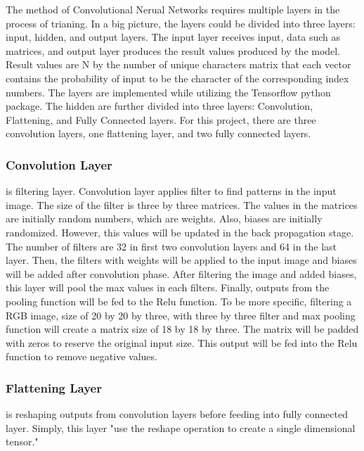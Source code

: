 The method of Convolutional Nerual Networks requires multiple layers in the process of trianing.
In a big picture, the layers could be divided into three layers: input, hidden, and output layers.
The input layer receives input, data such as matrices, and output layer produces the result values produced
by the model. Result values are N by the number of unique characters matrix that each vector contains the
probability of input to be the character of the corresponding index numbers. The layers are implemented while
utilizing the Tensorflow python package.
\newline
\newline
\indent
The hidden are further divided into three layers: Convolution, Flattening, and Fully Connected layers.
For this project, there are three convolution layers, one flattening layer, and two fully connected layers.

\subsubsection{Convolution Layer} is filtering layer.
Convolution layer applies filter to find patterns in the input image. The size of the filter is three by three matrices. The values
in the matrices are initially random numbers, which are weights. Also, biases are initially randomized.
However, this values will be updated in the back propagation
stage.
\newline
\newline
\indent
The number of filters are 32 in first two convolution layers and 64 in the last layer. Then, the filters with
weights will be applied to the input image and biases will be added after convolution phase. After filtering the
image and added biases, this layer will pool the max values in each filters. Finally, outputs from the pooling
function will be fed to the Relu function.
\newline
\newline
\indent
To be more specific, filtering a RGB image, size of 20 by 20 by three, with three by three filter and max pooling
function will create a matrix size of 18 by 18 by three. The matrix will be padded with zeros to reserve the original input
size. This output will be fed into the Relu function to remove negative values.

\subsubsection{Flattening Layer}
is reshaping outputs from convolution layers before feeding into fully connected layer. Simply,
this layer "use the reshape operation to create a single dimensional tensor."\cite{sachan_2017}



